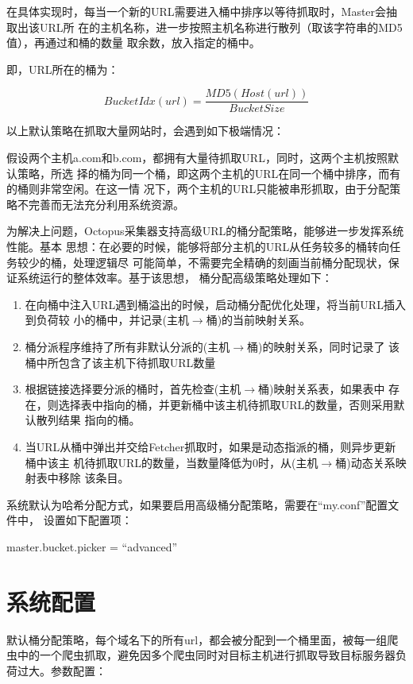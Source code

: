 在具体实现时，每当一个新的URL需要进入桶中排序以等待抓取时，Master会抽取出该URL所
在的主机名称，进一步按照主机名称进行散列（取该字符串的MD5值），再通过和桶的数量
取余数，放入指定的桶中。

即，URL所在的桶为：

\[
  BucketIdx(url) = \dfrac{MD5(Host(url))}{BucketSize}
\]

以上默认策略在抓取大量网站时，会遇到如下极端情况：

假设两个主机a.com和b.com，都拥有大量待抓取URL，同时，这两个主机按照默认策略，所选
择的桶为同一个桶，即这两个主机的URL在同一个桶中排序，而有的桶则非常空闲。在这一情
况下，两个主机的URL只能被串形抓取，由于分配策略不完善而无法充分利用系统资源。

为解决上问题，Octopus采集器支持高级URL的桶分配策略，能够进一步发挥系统性能。基本
思想：在必要的时候，能够将部分主机的URL从任务较多的桶转向任务较少的桶，处理逻辑尽
可能简单，不需要完全精确的刻画当前桶分配现状，保证系统运行的整体效率。基于该思想，
桶分配高级策略处理如下：

\begin{enumerate}
\item 在向桶中注入URL遇到桶溢出的时候，启动桶分配优化处理，将当前URL插入到负荷较
  小的桶中，并记录(主机$\rightarrow$桶)的当前映射关系。
\item 桶分派程序维持了所有非默认分派的(主机$\rightarrow$桶)的映射关系，同时记录了
  该桶中所包含了该主机下待抓取URL数量
\item 根据链接选择要分派的桶时，首先检查(主机$\rightarrow$桶)映射关系表，如果表中
  存在，则选择表中指向的桶，并更新桶中该主机待抓取URL的数量，否则采用默认散列结果
  指向的桶。
\item 当URL从桶中弹出并交给Fetcher抓取时，如果是动态指派的桶，则异步更新桶中该主
  机待抓取URL的数量，当数量降低为0时，从(主机$\rightarrow$桶)动态关系映射表中移除
  该条目。
\end{enumerate}

系统默认为哈希分配方式，如果要启用高级桶分配策略，需要在``my.conf''配置文件中，
设置如下配置项：

master.bucket.picker = ``advanced''


\section{系统配置}

默认桶分配策略，每个域名下的所有url，都会被分配到一个桶里面，被每一组爬虫中的一个爬虫抓取，避免因多个爬虫同时对目标主机进行抓取导致目标服务器负荷过大。参数配置：


